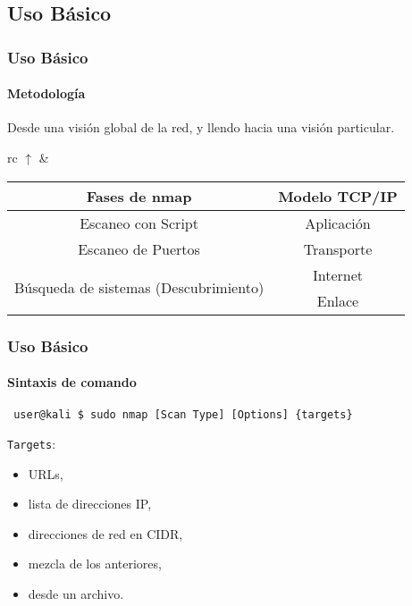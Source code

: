\documentclass[aspectratio=169]{beamer}
\begin{document}
\subsection{Uso B\'asico}
\begin{frame}[fragile]

    \frametitle{Uso B\'asico}

    \framesubtitle{Metodolog\'ia}

    \begin{block}{}
        \begin{center}
            Desde una visi\'on global de la red, y llendo hacia una visi\'on particular.
        \end{center}
    \end{block}

    \pause

    \begin{center}
        \begin{tabular}{rc}
            \Huge$\uparrow$ & 
            \begin{tabular}{cc}
                \textbf{Fases de nmap} & \textbf{Modelo TCP/IP}\\ \hline
                Escaneo con Script & Aplicaci\'on \\ \hline
                Escaneo de Puertos & Transporte \\ \hline
                \multirow{2}{*}{B\'usqueda de sistemas (Descubrimiento)} & Internet\\ \cline{2-2}
                & Enlace \\ \hline
            \end{tabular}
        \end{tabular}
    \end{center}

\end{frame}

\begin{frame}[fragile]
    \frametitle{Uso B\'asico}

    \framesubtitle{Sintaxis de comando}

    \begin{lstlisting}
 user@kali $ sudo nmap [Scan Type] [Options] {targets}
    \end{lstlisting}

    \texttt{Targets}:

    \begin{itemize}
        \item URLs,
        \item lista de direcciones IP,
        \item direcciones de red en CIDR,
        \item mezcla de los anteriores,
        \item desde un archivo.
    \end{itemize}

\end{frame}
\end{document}
